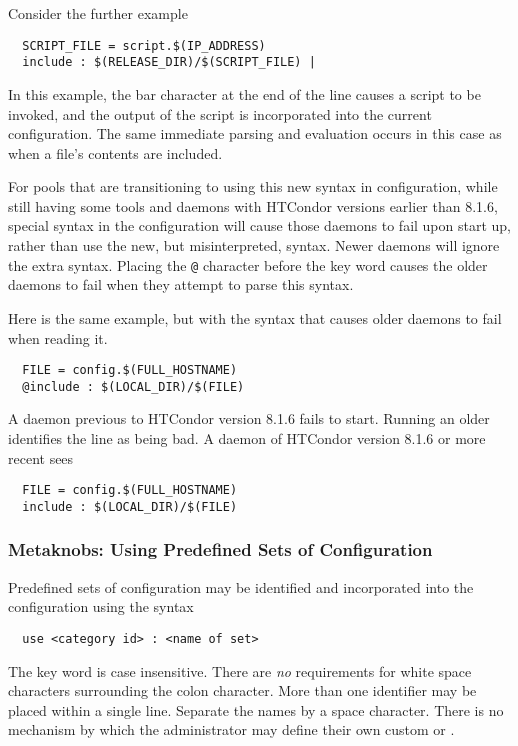 Consider the further example
\begin{verbatim}
  SCRIPT_FILE = script.$(IP_ADDRESS)
  include : $(RELEASE_DIR)/$(SCRIPT_FILE) |
\end{verbatim}
In this example, the bar character at the end of the line 
causes a script to be invoked,
and the output of the script is incorporated into the current
configuration.
The same immediate parsing and evaluation occurs in this
case as when a file's contents are included. 

For pools that are transitioning to using this new syntax in configuration,
while still having some tools and daemons with HTCondor versions 
earlier than 8.1.6,
special syntax in the configuration will cause those daemons to
fail upon start up,
rather than use the new, but misinterpreted, syntax. 
Newer daemons will ignore the extra syntax.
Placing the \verb|@| character before the  key word
causes the older daemons to fail when they attempt to
parse this syntax.

Here is the same example, but with the syntax that causes older daemons
to fail when reading it.
\begin{verbatim}
  FILE = config.$(FULL_HOSTNAME)
  @include : $(LOCAL_DIR)/$(FILE)
\end{verbatim}
A daemon previous to HTCondor version 8.1.6 fails to start.
Running an older  identifies the 
line as being bad.
A daemon of HTCondor version 8.1.6 or more recent sees
\begin{verbatim}
  FILE = config.$(FULL_HOSTNAME)
  include : $(LOCAL_DIR)/$(FILE)
\end{verbatim}


\subsubsection{\label{sec:Config-Metaknobs}Metaknobs: Using Predefined Sets of Configuration}
Predefined sets of configuration may be identified and incorporated
into the configuration using the syntax
\begin{verbatim}
  use <category id> : <name of set> 
\end{verbatim}

The  key word is case insensitive.
There are \emph{no} requirements for white space characters surrounding
the colon character.
More than one  identifier may be placed within
a single  line. 
Separate the names by a space character. 
There is no mechanism by which the administrator may define their
own custom  or .

